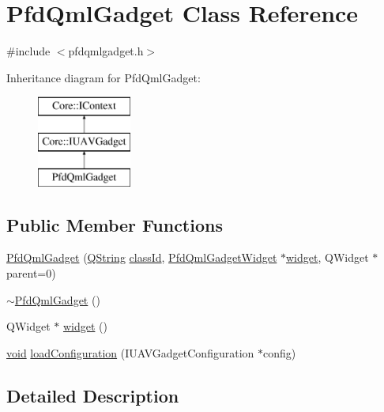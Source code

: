 \hypertarget{class_pfd_qml_gadget}{\section{\-Pfd\-Qml\-Gadget \-Class \-Reference}
\label{class_pfd_qml_gadget}
}


{\ttfamily \#include $<$pfdqmlgadget.\-h$>$}

\-Inheritance diagram for \-Pfd\-Qml\-Gadget\-:\begin{figure}[H]
\begin{center}
\leavevmode
\includegraphics[height=3.000000cm]{class_pfd_qml_gadget}
\end{center}
\end{figure}
\subsection*{\-Public \-Member \-Functions}
\begin{DoxyCompactItemize}
\item 
\hyperlink{class_pfd_qml_gadget_a093efe6f5e7c6edecf82f807a2f2b432}{\-Pfd\-Qml\-Gadget} (\hyperlink{group___u_a_v_objects_plugin_gab9d252f49c333c94a72f97ce3105a32d}{\-Q\-String} \hyperlink{group___core_plugin_ga3878fde66a57220608960bcc3fbeef2c}{class\-Id}, \hyperlink{class_pfd_qml_gadget_widget}{\-Pfd\-Qml\-Gadget\-Widget} $\ast$\hyperlink{class_pfd_qml_gadget_a339cafbdd73def4a8f18db1e411ad6ac}{widget}, \-Q\-Widget $\ast$parent=0)
\item 
\hyperlink{class_pfd_qml_gadget_a14a791e928788f5aca7b2430062955b2}{$\sim$\-Pfd\-Qml\-Gadget} ()
\item 
\-Q\-Widget $\ast$ \hyperlink{class_pfd_qml_gadget_a339cafbdd73def4a8f18db1e411ad6ac}{widget} ()
\item 
\hyperlink{group___u_a_v_objects_plugin_ga444cf2ff3f0ecbe028adce838d373f5c}{void} \hyperlink{class_pfd_qml_gadget_a55e852fc54261c7a6fc488a327dd4783}{load\-Configuration} (\-I\-U\-A\-V\-Gadget\-Configuration $\ast$config)
\end{DoxyCompactItemize}


\subsection{\-Detailed \-Description}


